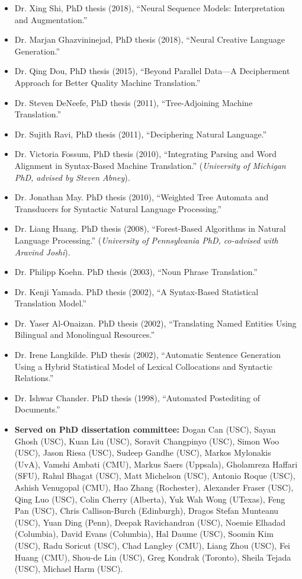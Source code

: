 \begin{itemize}
\item Dr. Xing Shi, PhD thesis (2018),
``Neural Sequence Models: Interpretation and Augmentation.''
\item Dr. Marjan Ghazvininejad, PhD thesis (2018),
``Neural Creative Language Generation.''
\item Dr. Qing Dou, PhD thesis (2015),
``Beyond Parallel Data---A Decipherment Approach for Better Quality
Machine Translation.''
\item Dr. Steven DeNeefe, PhD thesis (2011),
``Tree-Adjoining Machine Translation.''
\item Dr. Sujith Ravi, PhD thesis (2011),
``Deciphering Natural Language.''
\item Dr. Victoria Fossum, PhD thesis (2010),
``Integrating Parsing and Word Alignment in Syntax-Based Machine Translation.''
({\em University of Michigan PhD, advised by Steven Abney}).
\item Dr. Jonathan May.  PhD thesis (2010),
``Weighted Tree Automata and Transducers for
Syntactic Natural Language Processing.''
\item Dr. Liang Huang.  PhD thesis (2008),
``Forest-Based Algorithms in Natural Language Processing.''
({\em University of Pennsylvania PhD, co-advised with Aravind Joshi}).
\item Dr. Philipp Koehn.  PhD thesis (2003),
``Noun Phrase Translation.''  
\item Dr. Kenji Yamada. PhD thesis (2002),
``A Syntax-Based Statistical Translation Model.''
\item Dr. Yaser Al-Onaizan. PhD thesis (2002),
``Translating Named Entities Using Bilingual and 
Monolingual Resources.''
\item Dr. Irene Langkilde. PhD thesis (2002),
``Automatic Sentence Generation Using a Hybrid Statistical Model of 
Lexical Collocations and Syntactic Relations.''
\item Dr. Ishwar Chander. PhD thesis (1998), 
``Automated Postediting of Documents.''
\item {\bf Served on PhD dissertation committee:}
Dogan Can (USC),
Sayan Ghosh (USC),
Kuan Liu (USC),
Soravit Changpinyo (USC),
Simon Woo (USC),
Jason Riesa (USC),
Sudeep Gandhe (USC),
Markos Mylonakis (UvA),
Vamshi Ambati (CMU),
Markus Saers (Uppsala),
Gholamreza Haffari (SFU),
Rahul Bhagat (USC),
Matt Michelson (USC),
Antonio Roque (USC),
Ashish Venugopal (CMU),
Hao Zhang (Rochester),
Alexander Fraser (USC), 
Qing Luo (USC), 
Colin Cherry (Alberta),
Yuk Wah Wong (UTexas),
Feng Pan (USC), 
Chris Callison-Burch (Edinburgh),
Dragos Stefan Munteanu (USC), 
Yuan Ding (Penn), 
Deepak Ravichandran (USC), 
Noemie Elhadad (Columbia),
David Evans (Columbia), 
Hal Daume (USC), 
Soomin Kim (USC), 
Radu Soricut (USC), 
Chad Langley (CMU), 
Liang Zhou (USC), 
Fei Huang (CMU),
Shou-de Lin (USC), 
Greg Kondrak (Toronto), 
Sheila Tejada (USC), 
Michael Harm (USC).


\end{itemize}
